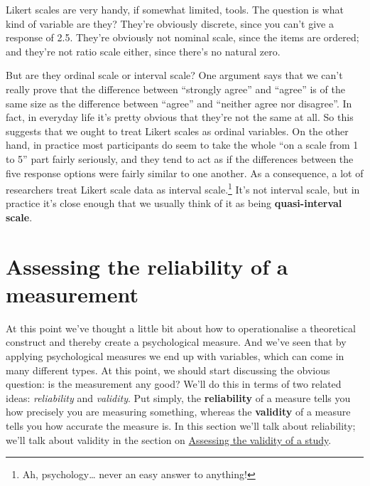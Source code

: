 \documentclass[
  a4paper,
]{book}
\begin{document}
Likert scales are very handy, if somewhat limited, tools. The question
is what kind of variable are they? They're obviously discrete, since you
can't give a response of 2.5. They're obviously not nominal scale, since
the items are ordered; and they're not ratio scale either, since there's
no natural zero.

But are they ordinal scale or interval scale? One argument says that we
can't really prove that the difference between ``strongly agree'' and
``agree'' is of the same size as the difference between ``agree'' and
``neither agree nor disagree''. In fact, in everyday life it's pretty
obvious that they're not the same at all. So this suggests that we ought
to treat Likert scales as ordinal variables. On the other hand, in
practice most participants do seem to take the whole ``on a scale from 1
to 5'' part fairly seriously, and they tend to act as if the differences
between the five response options were fairly similar to one another. As
a consequence, a lot of researchers treat Likert scale data as interval
scale.\footnote{Ah, psychology\ldots{} never an easy answer to anything!}
It's not interval scale, but in practice it's close enough that we
usually think of it as being \textbf{quasi-interval scale}.

\section{Assessing the reliability of a
measurement}\label{sec-Assessing-the-reliability-of-a-measurement}

At this point we've thought a little bit about how to operationalise a
theoretical construct and thereby create a psychological measure. And
we've seen that by applying psychological measures we end up with
variables, which can come in many different types. At this point, we
should start discussing the obvious question: is the measurement any
good? We'll do this in terms of two related ideas: \emph{reliability}
and \emph{validity}. Put simply, the \textbf{reliability} of a measure
tells you how precisely you are measuring something, whereas the
\textbf{validity} of a measure tells you how accurate the measure is. In
this section we'll talk about reliability; we'll talk about validity in
the section on \hyperref[assessing-the-validity-of-a-study]{Assessing
the validity of a study}.
\end{document}

